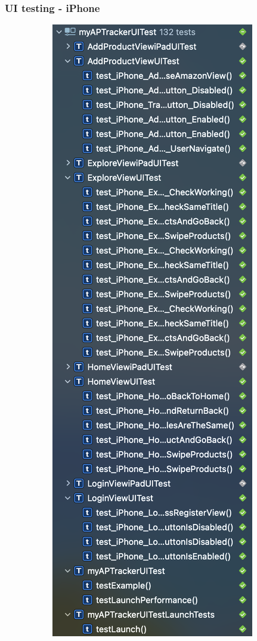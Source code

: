 \newpage
\subsubsection{UI testing - iPhone}
\begin{figure}[h!]
        \centering
        \begin{subfigure}[b]{0.3\textwidth}
        \centering
            \includegraphics[width=\textwidth]{images/testing/ui_testing_iphone_1.png}

\end{subfigure}
\end{figure}
